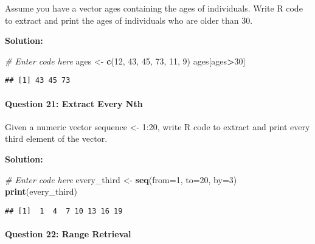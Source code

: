 \documentclass[
]{article}
\newenvironment{Shaded}{\begin{snugshade}}{\end{snugshade}}
\newcommand{\AttributeTok}[1]{\textcolor[rgb]{0.13,0.29,0.53}{#1}}
\newcommand{\CommentTok}[1]{\textcolor[rgb]{0.56,0.35,0.01}{\textit{#1}}}
\newcommand{\DecValTok}[1]{\textcolor[rgb]{0.00,0.00,0.81}{#1}}
\newcommand{\FunctionTok}[1]{\textcolor[rgb]{0.13,0.29,0.53}{\textbf{#1}}}
\newcommand{\NormalTok}[1]{#1}
\newcommand{\OtherTok}[1]{\textcolor[rgb]{0.56,0.35,0.01}{#1}}
\newcommand{\SpecialCharTok}[1]{\textcolor[rgb]{0.81,0.36,0.00}{\textbf{#1}}}
\begin{document}
Assume you have a vector ages containing the ages of individuals. Write
R code to extract and print the ages of individuals who are older than
30.

\textbf{Solution:}

\begin{Shaded}
\begin{Highlighting}[]
\CommentTok{\# Enter code here}
\NormalTok{ages }\OtherTok{\textless{}{-}} \FunctionTok{c}\NormalTok{(}\DecValTok{12}\NormalTok{, }\DecValTok{43}\NormalTok{, }\DecValTok{45}\NormalTok{, }\DecValTok{73}\NormalTok{, }\DecValTok{11}\NormalTok{, }\DecValTok{9}\NormalTok{)}
\NormalTok{ages[ages}\SpecialCharTok{\textgreater{}}\DecValTok{30}\NormalTok{]}
\end{Highlighting}
\end{Shaded}

\begin{verbatim}
## [1] 43 45 73
\end{verbatim}

\hypertarget{question-21-extract-every-nth}{%
\paragraph{Question 21: Extract Every
Nth}\label{question-21-extract-every-nth}}

Given a numeric vector sequence \textless- 1:20, write R code to extract
and print every third element of the vector.

\textbf{Solution:}

\begin{Shaded}
\begin{Highlighting}[]
\CommentTok{\# Enter code here}
\NormalTok{every\_third }\OtherTok{\textless{}{-}} \FunctionTok{seq}\NormalTok{(}\AttributeTok{from=}\DecValTok{1}\NormalTok{, }\AttributeTok{to=}\DecValTok{20}\NormalTok{, }\AttributeTok{by=}\DecValTok{3}\NormalTok{)}
\FunctionTok{print}\NormalTok{(every\_third)}
\end{Highlighting}
\end{Shaded}

\begin{verbatim}
## [1]  1  4  7 10 13 16 19
\end{verbatim}

\hypertarget{question-22-range-retrieval}{%
\paragraph{Question 22: Range
Retrieval}\label{question-22-range-retrieval}}
\end{document}
